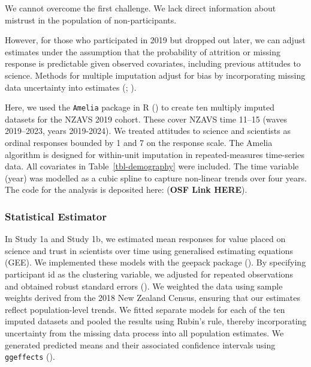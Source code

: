 \documentclass[
  single column]{article}
\begin{document}
We cannot overcome the first challenge. We lack direct information about
mistrust in the population of non-participants.

However, for those who participated in 2019 but dropped out later, we
can adjust estimates under the assumption that the probability of
attrition or missing response is predictable given observed covariates,
including previous attitudes to science. Methods for multiple imputation
adjust for bias by incorporating missing data uncertainty into estimates
(;
).

Here, we used the \texttt{Amelia} package in R
() to create ten
multiply imputed datasets for the NZAVS 2019 cohort. These cover NZAVS
time 11--15 (waves 2019--2023, years 2019-2024). We treated attitudes to
science and scientists as ordinal responses bounded by 1 and 7 on the
response scale. The Amelia algorithm is designed for within-unit
imputation in repeated-measures time-series data. All covariates in
Table~\ref{tbl-demography} were included. The time variable (year) was
modelled as a cubic spline to capture non-linear trends over four years.
The code for the analysis is deposited here: (\textbf{OSF Link HERE}).

\subsubsection{Statistical Estimator}\label{statistical-estimator}

In Study 1a and Study 1b, we estimated mean responses for value placed
on science and trust in scientists over time using generalised
estimating equations (GEE). We implemented these models with the geepack
package (). By
specifying participant id as the clustering variable, we adjusted for
repeated observations and obtained robust standard errors
(). We
weighted the data using sample weights derived from the 2018 New Zealand
Census, ensuring that our estimates reflect population-level trends. We
fitted separate models for each of the ten imputed datasets and pooled
the results using Rubin's rule, thereby incorporating uncertainty from
the missing data process into all population estimates. We generated
predicted means and their associated confidence intervals using
\texttt{ggeffects} ().
\end{document}
